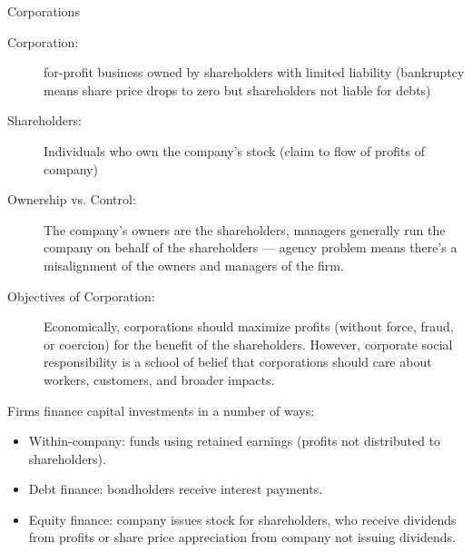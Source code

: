 \documentclass[10pt]{extarticle}
\begin{document}
  \begin{problem}{Corporations}
    \begin{description}
      \item[Corporation:] for-profit business owned by shareholders with limited liability (bankruptcy means share price drops to zero but shareholders not liable for debts)
      \item[Shareholders:] Individuals who own the company's stock (claim to flow of profits of company)
      \item[Ownership vs. Control:] The company's owners are the shareholders, managers generally run the company on behalf of the shareholders --- agency problem means there's a misalignment of the owners and managers of the firm.
      \item[Objectives of Corporation:] Economically, corporations should maximize profits (without force, fraud, or coercion) for the benefit of the shareholders. However, corporate social responsibility is a school of belief that corporations should care about workers, customers, and broader impacts.
    \end{description}
    Firms finance capital investments in a number of ways:
    \begin{itemize}
      \item Within-company: funds using retained earnings (profits not distributed to shareholders).
      \item Debt finance: bondholders receive interest payments.
      \item Equity finance: company issues stock for shareholders, who receive dividends from profits or share price appreciation from company not issuing dividends.
    \end{itemize}
  \end{problem}
\end{document}
